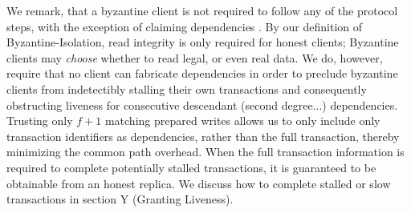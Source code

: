 We remark, that a byzantine client is not required to follow any of the protocol steps, with the exception of claiming dependencies . By our definition of Byzantine-Isolation, read integrity is only required for honest clients; Byzantine clients may \textit{choose} whether to read legal, or even real data. We do, however, require that no client can fabricate dependencies in order to preclude byzantine clients from indetectibly stalling their own transactions and consequently obstructing liveness for consecutive descendant (second degree...) dependencies.
Trusting only $f+1$ matching prepared writes allows us to only include only transaction identifiers as dependencies, rather than the full transaction, thereby minimizing the common path overhead. When the full transaction information is required to complete potentially stalled transactions, it is guaranteed to be obtainable from an honest replica. We discuss how to complete stalled or slow transactions in section Y (Granting Liveness).




